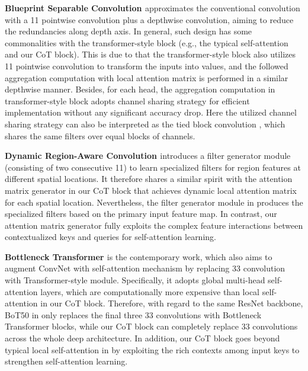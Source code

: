 \documentclass[10pt,twocolumn,letterpaper]{article}
\begin{document}
\textbf{Blueprint Separable Convolution \cite{haase2020rethinking}} approximates the conventional convolution with a 11 pointwise convolution plus a  depthwise convolution, aiming to reduce the redundancies along depth axis. In general, such design has some commonalities with the transformer-style block (e.g., the typical self-attention and our CoT block). This is due to that the transformer-style block also utilizes 11 pointwise convolution to transform the inputs into values, and the followed aggregation computation with  local attention matrix is performed in a similar depthwise manner. Besides, for each head, the aggregation computation in transformer-style block adopts channel sharing strategy for efficient implementation without any significant accuracy drop. Here the utilized channel sharing strategy can also be interpreted as the tied block convolution \cite{wang2020tied}, which shares the same filters over equal blocks of channels.

\textbf{Dynamic Region-Aware Convolution \cite{chen2020dynamic}} introduces a filter generator module (consisting of two consecutive 11) to learn specialized filters for region features at different spatial locations. It therefore shares a similar spirit with the attention matrix generator in our CoT block that achieves dynamic local attention matrix for each spatial location. Nevertheless, the filter generator module in \cite{chen2020dynamic} produces the specialized filters based on the primary input feature map. In contrast, our attention matrix generator fully exploits the complex feature interactions between contextualized keys and queries for self-attention learning.

\textbf{Bottleneck Transformer \cite{srinivas2021bottleneck}} is the contemporary work, which also aims to augment ConvNet with self-attention mechanism by replacing 33 convolution with Transformer-style module. Specifically, it adopts global multi-head self-attention layers, which are computationally more expensive than local self-attention in our CoT block. Therefore, with regard to the same ResNet backbone, BoT50 in \cite{srinivas2021bottleneck} only replaces the final three 33 convolutions with Bottleneck Transformer blocks, while our CoT block can completely replace 33 convolutions across the whole deep architecture. In addition, our CoT block goes beyond typical local self-attention in \cite{hu2019local,ramachandran2019stand,zhao2020exploring} by exploiting the rich contexts among input keys to strengthen self-attention learning.
\end{document}
